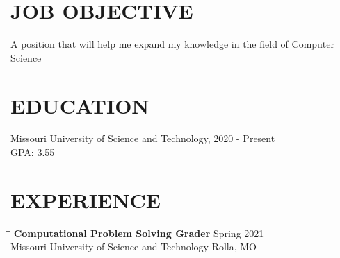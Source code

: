 \documentclass{res}
\begin{document}
 


\address{\bf \textcolor{blue}{\underline{\href{https://github.com/Skrublaub/resume}{LINK TO THIS RESUME}}}}
                                  
\begin{resume}

\section{JOB OBJECTIVE}          
    A position that will help me expand my knowledge in the field
    of Computer Science
 
\section{EDUCATION}          
    Missouri University of Science and Technology, 2020 - Present\\        
    GPA: 3.55          

 
\section{EXPERIENCE}
   \vspace{-0.1in}	
   \begin{tabbing}
   \hspace{2.3in}\= \hspace{2.6in}\= \kill %
    {\bf Computational Problem Solving Grader} \>  \>Spring 2021\\
    		Missouri University of Science and Technology\>\> Rolla, MO\\
                             

\end{tabbing}
\end{resume}
\end{document}
